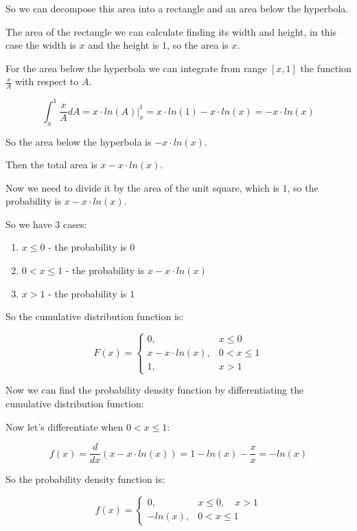 So we can decompose this area into a rectangle and an area below the hyperbola.

The area of the rectangle we can calculate finding its width and height, in this
case the width is $x$ and the height is $1$, so the area is $x$.

For the area below the hyperbola we can integrate from range $[x, 1]$ the function
$\frac{x}{A}$ with respect to $A$.

\begin{equation*}
    \int_{x}^{1} \frac{x}{A} dA = x \cdot ln(A) \Big|_{x}^{1} = x \cdot ln(1) - x \cdot ln(x) = -x \cdot ln(x)
\end{equation*}

So the area below the hyperbola is $-x \cdot ln(x)$.

Then the total area is $x - x \cdot ln(x)$.

Now we need to divide it by the area of the unit square, which is $1$,
so the probability is $x - x \cdot ln(x)$.

So we have $3$ cases:

\begin{enumerate}
    \item $x \leq 0$ - the probability is $0$
    \item $0 < x \leq 1$ - the probability is $x - x \cdot ln(x)$
    \item $x > 1$ - the probability is $1$
\end{enumerate}

So the cumulative distribution function is:

\begin{equation*}
    F(x) = \begin{cases}
        0,                 & x \leq 0     \\
        x - x \cdot ln(x), & 0 < x \leq 1 \\
        1,                 & x > 1
    \end{cases}
\end{equation*}

Now we can find the probability density function by differentiating the cumulative
distribution function:

Now let's differentiate when $0 < x \leq 1$:

\begin{equation*}
    f(x) = \frac{d}{dx} (x - x \cdot ln(x)) = 1 - ln(x) - \frac{x}{x} = -ln(x)
\end{equation*}

So the probability density function is:

\begin{equation*}
    f(x) = \begin{cases}
        0,      & x \leq 0,\quad x > 1 \\
        -ln(x), & 0 < x \leq 1
    \end{cases}
\end{equation*}

